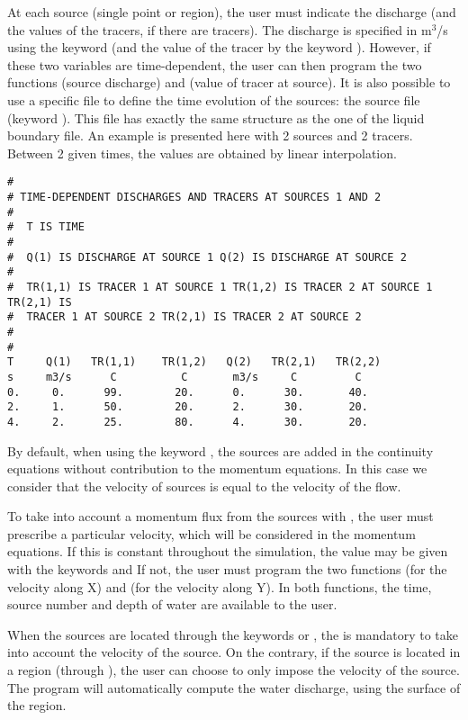 At each source (single point or region), the user must indicate the discharge
(and the values of the tracers, if there are tracers).
The discharge is specified in m${}^{3}$/s using
the keyword  (and the value of the tracer by
the keyword ). However, if these
two variables are time-dependent, the user can then program the two functions
 (source discharge) and  (value of tracer at
source). It is also possible to use a specific file to define the time
evolution of the sources:
the source file (keyword ). This file has exactly the same
structure as the one of the liquid boundary file. An example is presented here
with 2 sources and 2 tracers. Between 2 given times, the values are obtained by
linear interpolation.
\begin{lstlisting}[language=TelemacCas]
#
# TIME-DEPENDENT DISCHARGES AND TRACERS AT SOURCES 1 AND 2
#
#  T IS TIME
#
#  Q(1) IS DISCHARGE AT SOURCE 1 Q(2) IS DISCHARGE AT SOURCE 2
#
#  TR(1,1) IS TRACER 1 AT SOURCE 1 TR(1,2) IS TRACER 2 AT SOURCE 1 TR(2,1) IS
#  TRACER 1 AT SOURCE 2 TR(2,1) IS TRACER 2 AT SOURCE 2
#
#
T     Q(1)   TR(1,1)    TR(1,2)   Q(2)   TR(2,1)   TR(2,2)
s     m3/s      C          C       m3/s     C         C
0.     0.      99.        20.      0.      30.       40.
2.     1.      50.        20.      2.      30.       20.
4.     2.      25.        80.      4.      30.       20.
\end{lstlisting}
By default, when using the keyword , the
sources are added in the continuity equations without contribution to the
momentum equations. In this case we consider that the velocity of sources is
equal to the velocity of the flow.

To take into account a momentum flux from the sources with , the
user must prescribe a particular velocity, which will be considered in the
momentum equations.  If this is constant throughout the simulation, the value
may be given with the keywords  and
 If not, the user must program the
two functions  (for the velocity along X) and 
(for the velocity along Y). In both functions, the time, source number and
depth of water are available to the user.

When the sources are located through the keywords 
or , the 
is mandatory to take into account the velocity of the source.
On the contrary, if the source is located in a region (through
), the user can choose
to only impose the velocity of the source.
The program will automatically compute the water discharge, using the surface
of the region.

